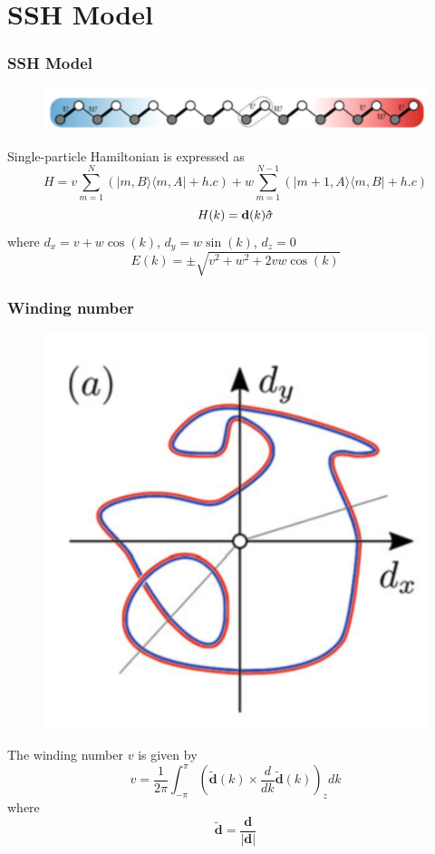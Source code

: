 \documentclass{beamer}
\begin{document}
\section{SSH Model}
\begin{frame}
\frametitle{SSH Model}
\begin{figure}
\includegraphics[scale=0.5]{figure/ssh1.png}
\end{figure}
Single-particle Hamiltonian is expressed as
\begin{equation}
H=v\sum_{m=1}^{N}(|m,B\rangle\langle m,A|+h.c)+w\sum_{m=1}^{N-1}(|m+1,A\rangle\langle m,B|+h.c)
\end{equation}
\begin{equation}
H(k)=\mathbf{d}(k)\bf{\hat{\sigma}}
\end{equation}
where $d_x=v+w\cos(k)$, $d_y=w\sin(k)$, $d_z=0$
\begin{equation}
E(k)=\pm\sqrt{v^2+w^2+2vw\cos(k)}
\end{equation}
\end{frame}
\begin{frame}
\frametitle{Winding number}
\begin{figure}
\includegraphics[scale=0.3]{figure/ssh3.png}
\end{figure}
The winding number $v$ is given by
\begin{equation}
v=\frac{1}{2\pi}\int_{-\pi}^{\pi}(\tilde{\mathbf{d}}(k)\times \frac{d}{dk}\tilde{\mathbf{d}}(k))_zdk
\end{equation}
where
$$\tilde{\mathbf{d}}=\frac{\mathbf{d}}{|\mathbf{d}|}$$
\end{frame}
\end{document}
